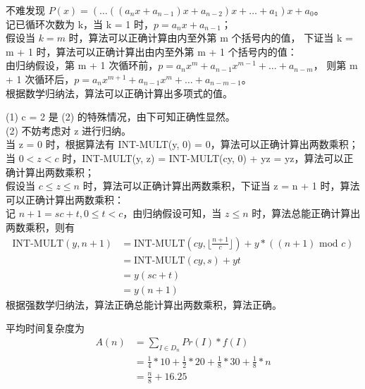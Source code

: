 \documentclass[12pt, a4paper, oneside]{ctexart}
\begin{document}
\begin{solution}[1.7]
不难发现 $P(x) = ( \dots ((a_n x + a_{n - 1})x + a_{n - 2})x + \dots + a_1)x + a_0$。
\\记已循环次数为 k，当 k = 1 时，$p = a_n x + a_{n - 1}$；
\\假设当 $k = m$ 时，算法可以正确计算由内至外第 m 个括号内的值，
下证当 k = m + 1 时，算法可以正确计算出由内至外第 m + 1 个括号内的值：
\\由归纳假设，第 m + 1 次循环前，$p = a_n x^{m} + a_{n - 1} x^{m - 1} + \dots + a_{n - m}$，
则第 m + 1 次循环后，$p = a_n x^{m + 1} + a_{n - 1} x^m + \dots + a_{n - m - 1}$。
\\根据数学归纳法，算法可以正确计算出多项式的值。
\end{solution}

\begin{solution}[1.8]
(1) c = 2 是 (2) 的特殊情况，由下可知正确性显然。
\\(2) 不妨考虑对 z 进行归纳。
\\当 z = 0 时，根据算法有 INT-MULT(y, 0) = 0，算法可以正确计算出两数乘积；
\\当 $0 < z < c$ 时，INT-MULT(y, z) = INT-MULT(cy, 0) + yz = yz，算法可以正确计算出两数乘积；
\\假设当 $c \leq z \leq n$ 时，算法可以正确计算出两数乘积，下证当 z = n + 1 时，算法可以正确计算出两数乘积：
\\记 $n + 1 = sc + t, 0 \leq t < c$，由归纳假设可知，当 $z \leq n$ 时，算法总能正确计算出两数乘积，则有
\begin{align*}
    \text{INT-MULT}(y, n + 1) &= \text{INT-MULT}(cy, \lfloor \frac{n + 1}{c} \rfloor) + y * ((n + 1) \text{ mod } c) \\
    &= \text{INT-MULT}(cy, s) + yt \\
    &= y(sc + t) \\
    &= y(n + 1)  
\end{align*}
根据强数学归纳法，算法正确总能计算出两数乘积，算法正确。
\end{solution}

\newpage
\begin{solution}[1.9]
平均时间复杂度为
\begin{align*}
    A(n) &= \sum_{I \in D_n} Pr(I) * f(I) \\
    &= \frac{1}{4} * 10 + \frac{1}{2} * 20 + \frac{1}{8} * 30 + \frac{1}{8} * n \\
    &= \frac{n}{8} + 16.25
\end{align*}
\end{solution}
\end{document}
